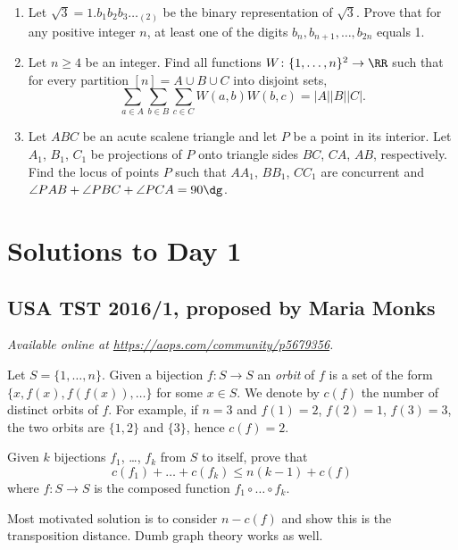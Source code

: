 \documentclass[11pt]{scrartcl}
\begin{document}
\begin{enumerate}[\bfseries 1.]
\item %
Let $\sqrt{3}=1.b_1b_2b_3\dots_{(2)}$ be the binary representation
of $\sqrt 3$. Prove that for any positive integer $n$, at least one of
the digits $b_n, b_{n+1}, \dots, b_{2n}$ equals 1.

\item %
Let $n \ge 4$ be an integer.
Find all functions $W \colon \{1, \dots, n\}^2 \to \RR$ such that
for every partition $[n] = A \cup B \cup C$ into disjoint sets,
\[ \sum_{a \in A} \sum_{b \in B} \sum_{c \in C} W(a,b) W(b,c)
= |A| |B| |C|. \]

\item %
Let $ABC$ be an acute scalene triangle
and let $P$ be a point in its interior.
Let $A_1$, $B_1$, $C_1$ be projections of $P$ onto
triangle sides $BC$, $CA$, $AB$, respectively.
Find the locus of points $P$ such that
$AA_1$, $BB_1$, $CC_1$ are concurrent
and $\angle PAB + \angle PBC + \angle PCA = 90\dg$.

\end{enumerate}
\pagebreak

\section{Solutions to Day 1}
\subsection{USA TST 2016/1, proposed by Maria Monks}
\textsl{Available online at \url{https://aops.com/community/p5679356}.}
\begin{mdframed}[style=mdpurplebox,frametitle={Problem statement}]
Let $S = \{1, \dots, n\}$.
Given a bijection $f \colon S \to S$ an \emph{orbit} of $f$ is a
set of the form $\{x, f(x), f(f(x)), \dots \}$ for some $x \in S$.
We denote by $c(f)$ the number of distinct orbits of $f$.
For example, if $n=3$ and $f(1)=2$, $f(2)=1$, $f(3)=3$,
the two orbits are $\{1,2\}$ and $\{3\}$, hence $c(f)=2$.

Given $k$ bijections $f_1$, \dots, $f_k$ from $S$ to itself, prove that
\[ c(f_1) + \dots + c(f_k) \le n(k-1) + c(f) \]
where $f \colon S \to S$ is the composed function $f_1 \circ \dots \circ f_k$.
\end{mdframed}
Most motivated solution is to consider $n - c(f)$ and show this is the transposition distance.
Dumb graph theory works as well.
\pagebreak
\end{document}

